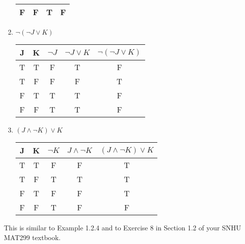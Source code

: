 \begin{prob}
\begin{enumerate}
\begin{center}
\begin{tabular}{|c|c|c|c|}
F & F & T          & F                   \\
\hline
\end{tabular}
\end{center}
\item $ \neg (\neg J \vee K) $\\
\begin{center}
\begin{tabular}{|c|c|c|c|c|} 
\hline
J & K & $ \neg J $ & $ \neg J \vee K $ & $ \neg ( \neg J \vee K ) $ \\
\hline
T & T & F          & T                 & F                          \\
T & F & F          & F                 & T                          \\
F & T & T          & T                 & F                          \\
F & F & T          & T                 & F                          \\
\hline
\end{tabular}
\end{center}
\item $ (J \wedge \neg K) \vee K $\\
\begin{center}
\begin{tabular}{|c|c|c|c|c|} 
\hline
J & K & $ \neg K $ & $ J \wedge \neg K $ & $ ( J \wedge \neg K ) \vee K $ \\
\hline
T & T & F          & F                   & T                              \\
T & F & T          & T                   & T                              \\
F & T & F          & F                   & T                              \\
F & F & T          & F                   & F                              \\
\hline
\end{tabular}
\end{center}
\end{enumerate}
This is similar to Example 1.2.4 and to Exercise 8 in Section 1.2 of your SNHU MAT299 textbook.
\end{prob}
